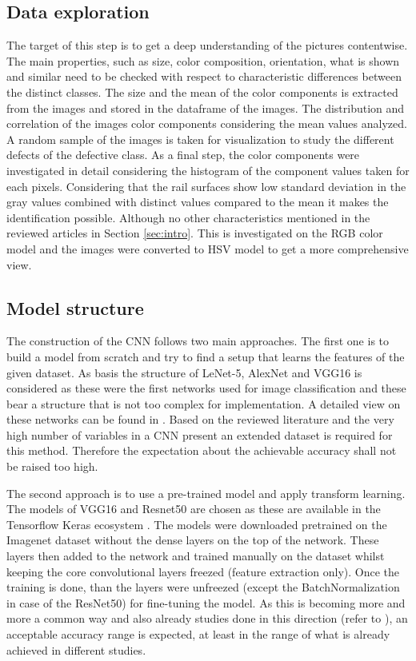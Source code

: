 \documentclass[10pt, final]{article}
\begin{document}
\subsection{Data exploration}
The target of this step is to get a deep understanding of the pictures contentwise.
The main properties, such as size, color composition, orientation, what is shown and similar need to be
checked with respect to characteristic differences between the distinct classes.
The size and the mean of the color components is extracted from the images and stored in the dataframe
of the images.
The distribution and correlation of the images color components considering the mean values analyzed.
A random sample of the images is taken for visualization to study the different defects of the defective class.
As a final step, the color components were investigated in detail considering the histogram of the component
values taken for each pixels.
Considering that the rail surfaces show low standard deviation in the gray values combined with distinct
values compared to the mean it makes the identification possible.
Although no other characteristics mentioned in the reviewed articles in Section \ref{sec:intro}.
This is investigated on the RGB color model and the images were converted to HSV model to get a more
comprehensive view.

\subsection{Model structure}
The construction of the CNN follows two main approaches.
The first one is to build a model from scratch and try to find a setup that learns the features of the given
dataset.
As basis the structure of LeNet-5, AlexNet and VGG16 is considered as these were the first networks used for image
classification and these bear a structure that is not too complex for implementation.
A detailed view on these networks can be found in \cite{karim_illustrated_2022}.
Based on the reviewed literature and the very high number of variables in a CNN present an extended dataset is
required for this method.
Therefore the expectation about the achievable accuracy shall not be raised too high.

The second approach is to use a pre-trained model and apply transform learning.
The models of VGG16 and Resnet50 are chosen as these are available in the Tensorflow
Keras ecosystem \cite{keras_applications}.
The models were downloaded pretrained on the Imagenet dataset without the dense layers on the top of the network.
These layers then added to the network and trained manually on the dataset whilst keeping the core convolutional
layers freezed (feature extraction only).
Once the training is done, than the layers were unfreezed (except the BatchNormalization in case of the ResNet50)
for fine-tuning the model.
As this is becoming more and more a common way and also already studies done in this direction
(refer to \cite{_railway_}), an acceptable accuracy range is expected, at least in the range of what is already
achieved in different studies.
\end{document}
